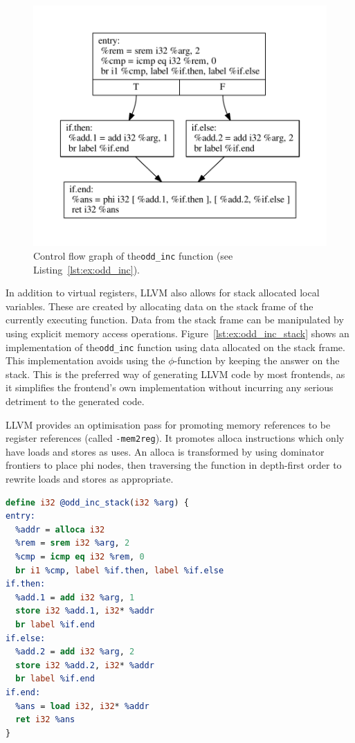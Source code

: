 \begin{figure}[h]
  \centering
  \includegraphics[scale=0.7]{figs/cfg-odd_inc.pdf}
  \caption{Control flow graph of the\lstinline[language=llvm,style=nasm]{odd_inc} function (see Listing~\ref{lst:ex:odd_inc}).}
  \label{fig:cfg-odd_inc}
\end{figure}

In addition to virtual registers, LLVM also allows for stack allocated local variables.
These are created by allocating data on the stack frame of the currently executing function.
Data from the stack frame can be manipulated by using explicit memory access operations.
Figure~\ref{lst:ex:odd_inc_stack} shows an implementation of the\lstinline[language=llvm,style=nasm]{odd_inc} function using data allocated on the stack frame.
This implementation avoids using the $\phi$-function by keeping the answer on the stack.
This is the preferred way of generating LLVM code by most frontends, as it simplifies the frontend's own implementation without incurring any serious detriment to the generated code.

LLVM provides an optimisation pass for promoting memory references to be register references (called \texttt{-mem2reg}).
It promotes alloca instructions which only have loads and stores as uses.
An alloca is transformed by using dominator frontiers to place phi nodes, then traversing the function in depth-first order to rewrite loads and stores as appropriate.

\begin{lstlisting}[language=llvm,style=nasm,caption={An example of the odd\_inc function implemented using data allocated on the stack frame.}, label={lst:ex:odd_inc_stack}]
define i32 @odd_inc_stack(i32 %arg) {
entry:
  %addr = alloca i32
  %rem = srem i32 %arg, 2
  %cmp = icmp eq i32 %rem, 0
  br i1 %cmp, label %if.then, label %if.else
if.then:
  %add.1 = add i32 %arg, 1
  store i32 %add.1, i32* %addr
  br label %if.end
if.else:
  %add.2 = add i32 %arg, 2
  store i32 %add.2, i32* %addr
  br label %if.end
if.end:
  %ans = load i32, i32* %addr
  ret i32 %ans
}
\end{lstlisting}

